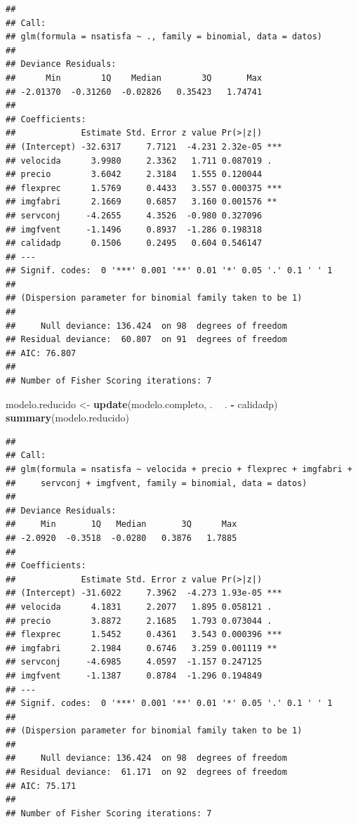 \documentclass[]{book}
\newenvironment{Shaded}{\begin{snugshade}}{\end{snugshade}}
\newcommand{\KeywordTok}[1]{\textcolor[rgb]{0.13,0.29,0.53}{\textbf{#1}}}
\newcommand{\StringTok}[1]{\textcolor[rgb]{0.31,0.60,0.02}{#1}}
\newcommand{\OperatorTok}[1]{\textcolor[rgb]{0.81,0.36,0.00}{\textbf{#1}}}
\newcommand{\NormalTok}[1]{#1}
\begin{document}
\begin{verbatim}
## 
## Call:
## glm(formula = nsatisfa ~ ., family = binomial, data = datos)
## 
## Deviance Residuals: 
##      Min        1Q    Median        3Q       Max  
## -2.01370  -0.31260  -0.02826   0.35423   1.74741  
## 
## Coefficients:
##             Estimate Std. Error z value Pr(>|z|)    
## (Intercept) -32.6317     7.7121  -4.231 2.32e-05 ***
## velocida      3.9980     2.3362   1.711 0.087019 .  
## precio        3.6042     2.3184   1.555 0.120044    
## flexprec      1.5769     0.4433   3.557 0.000375 ***
## imgfabri      2.1669     0.6857   3.160 0.001576 ** 
## servconj     -4.2655     4.3526  -0.980 0.327096    
## imgfvent     -1.1496     0.8937  -1.286 0.198318    
## calidadp      0.1506     0.2495   0.604 0.546147    
## ---
## Signif. codes:  0 '***' 0.001 '**' 0.01 '*' 0.05 '.' 0.1 ' ' 1
## 
## (Dispersion parameter for binomial family taken to be 1)
## 
##     Null deviance: 136.424  on 98  degrees of freedom
## Residual deviance:  60.807  on 91  degrees of freedom
## AIC: 76.807
## 
## Number of Fisher Scoring iterations: 7
\end{verbatim}

\begin{Shaded}
\begin{Highlighting}[]
\NormalTok{modelo.reducido <-}\StringTok{ }\KeywordTok{update}\NormalTok{(modelo.completo, . }\OperatorTok{~}\StringTok{ }\NormalTok{. }\OperatorTok{-}\StringTok{ }\NormalTok{calidadp)}
\KeywordTok{summary}\NormalTok{(modelo.reducido)}
\end{Highlighting}
\end{Shaded}

\begin{verbatim}
## 
## Call:
## glm(formula = nsatisfa ~ velocida + precio + flexprec + imgfabri + 
##     servconj + imgfvent, family = binomial, data = datos)
## 
## Deviance Residuals: 
##     Min       1Q   Median       3Q      Max  
## -2.0920  -0.3518  -0.0280   0.3876   1.7885  
## 
## Coefficients:
##             Estimate Std. Error z value Pr(>|z|)    
## (Intercept) -31.6022     7.3962  -4.273 1.93e-05 ***
## velocida      4.1831     2.2077   1.895 0.058121 .  
## precio        3.8872     2.1685   1.793 0.073044 .  
## flexprec      1.5452     0.4361   3.543 0.000396 ***
## imgfabri      2.1984     0.6746   3.259 0.001119 ** 
## servconj     -4.6985     4.0597  -1.157 0.247125    
## imgfvent     -1.1387     0.8784  -1.296 0.194849    
## ---
## Signif. codes:  0 '***' 0.001 '**' 0.01 '*' 0.05 '.' 0.1 ' ' 1
## 
## (Dispersion parameter for binomial family taken to be 1)
## 
##     Null deviance: 136.424  on 98  degrees of freedom
## Residual deviance:  61.171  on 92  degrees of freedom
## AIC: 75.171
## 
## Number of Fisher Scoring iterations: 7
\end{verbatim}
\end{document}
